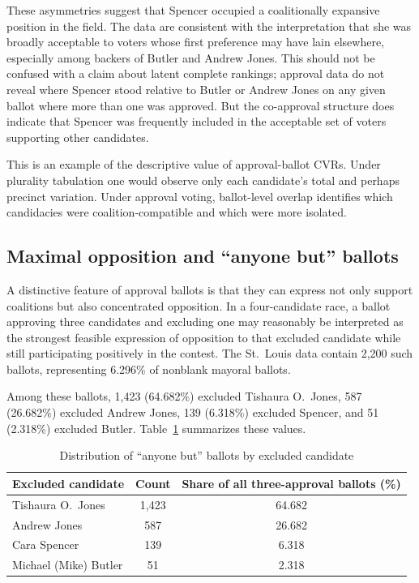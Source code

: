 \documentclass[11pt]{article}
\begin{document}
These asymmetries suggest that Spencer occupied a coalitionally expansive position in the field. The data are consistent with the interpretation that she was broadly acceptable to voters whose first preference may have lain elsewhere, especially among backers of Butler and Andrew Jones. This should not be confused with a claim about latent complete rankings; approval data do not reveal where Spencer stood relative to Butler or Andrew Jones on any given ballot where more than one was approved. But the co-approval structure does indicate that Spencer was frequently included in the acceptable set of voters supporting other candidates.

This is an example of the descriptive value of approval-ballot CVRs. Under plurality tabulation one would observe only each candidate's total and perhaps precinct variation. Under approval voting, ballot-level overlap identifies which candidacies were coalition-compatible and which were more isolated.

\subsection{Maximal opposition and ``anyone but'' ballots}
A distinctive feature of approval ballots is that they can express not only support coalitions but also concentrated opposition. In a four-candidate race, a ballot approving three candidates and excluding one may reasonably be interpreted as the strongest feasible expression of opposition to that excluded candidate while still participating positively in the contest. The St.~Louis data contain 2,200 such ballots, representing 6.296\% of nonblank mayoral ballots.

Among these ballots, 1,423 (64.682\%) excluded Tishaura O.~Jones, 587 (26.682\%) excluded Andrew Jones, 139 (6.318\%) excluded Spencer, and 51 (2.318\%) excluded Butler. Table~\ref{tab:anyonebut} summarizes these values.

\begin{table}[htbp]
\centering
\caption{Distribution of ``anyone but'' ballots by excluded candidate}
\label{tab:anyonebut}
\begin{tabular}{lcc}
\toprule
Excluded candidate & Count & Share of all three-approval ballots (\%) \\
\midrule
Tishaura O.~Jones & 1,423 & 64.682 \\
Andrew Jones & 587 & 26.682 \\
Cara Spencer & 139 & 6.318 \\
Michael (Mike) Butler & 51 & 2.318 \\
\bottomrule
\end{tabular}
\end{table}
\end{document}
